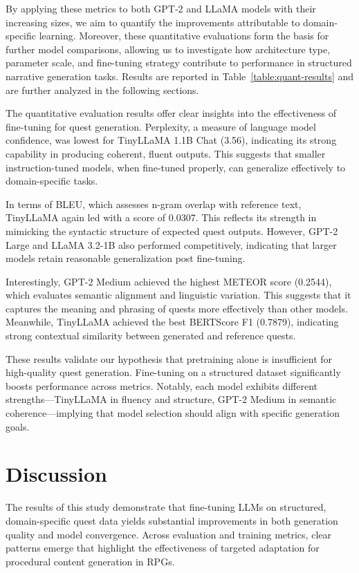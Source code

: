 By applying these metrics to both GPT-2 and LLaMA models with their increasing
sizes, we aim to quantify the improvements attributable to domain-specific learning.
Moreover, these quantitative evaluations form the basis for further model comparisons,
allowing us to investigate how architecture type, parameter scale, and fine-tuning strategy
contribute to performance in structured narrative generation tasks. Results are reported
in Table~\ref{table:quant-results} and are further analyzed in the following sections.

The quantitative evaluation results offer clear insights into the effectiveness of fine-tuning
for quest generation. Perplexity, a measure of language model confidence, was lowest
for TinyLLaMA 1.1B Chat (3.56), indicating its strong capability in producing
coherent, fluent outputs. This suggests that smaller instruction-tuned models, when fine-tuned
properly, can generalize effectively to domain-specific tasks.

In terms of BLEU, which assesses n-gram overlap with reference text, TinyLLaMA
again led with a score of 0.0307. This reflects its strength in mimicking the syntactic
structure of expected quest outputs. However, GPT-2 Large and LLaMA 3.2-1B also
performed competitively, indicating that larger models retain reasonable generalization
post fine-tuning.

Interestingly, GPT-2 Medium achieved the highest METEOR score (0.2544), which
evaluates semantic alignment and linguistic variation. This suggests that it captures the
meaning and phrasing of quests more effectively than other models. Meanwhile, TinyLLaMA
achieved the best BERTScore F1 (0.7879), indicating strong contextual similarity
between generated and reference quests.

These results validate our hypothesis that pretraining alone is insufficient for high-quality
quest generation. Fine-tuning on a structured dataset significantly boosts performance
across metrics. Notably, each model exhibits different strengths—TinyLLaMA
in fluency and structure, GPT-2 Medium in semantic coherence—implying that model
selection should align with specific generation goals.

\section{Discussion}

The results of this study demonstrate that fine-tuning LLMs on structured, domain-specific
quest data yields substantial improvements in both generation quality and model
convergence. Across evaluation and training metrics, clear patterns emerge that highlight
the effectiveness of targeted adaptation for procedural content generation in RPGs.

